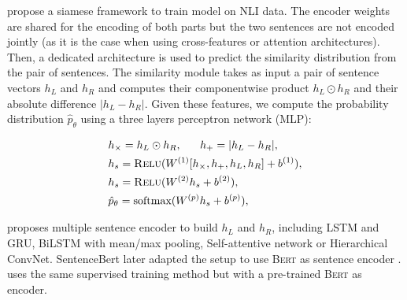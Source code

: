 \textcite{conneau_17} propose a siamese framework to train model on NLI data.  The encoder weights are shared for the encoding of both parts but the two sentences are not encoded jointly (as it is the case when using cross-features or attention architectures). Then, a dedicated architecture is used to predict the similarity distribution from the pair of sentences. The similarity module takes as input a pair of sentence vectors $h_{L} $ and $h_{R}$ and computes their component\-wise product $h_{L} \odot h_{R}$ and their absolute difference $|h_{L} - h_{R}|$. Given these features, we compute the probability distribution  $\hat{p}_{\theta}$ using a three layers perceptron network (MLP):

\begin{align}
\begin{split}
&h_{\times}=h_L\odot h_R, ~~~~~h_{+} = |h_L - h_R |, \\
&h_s = \textsc{Relu}(W^{(1)}[h_{\times}, h_{+}, h_L, h_R] + b^{(1)}), \\
&h_s = \textsc{Relu}(W^{(2)}h_s + b^{(2)}), \\
&\hat{p}_{\theta} = \text{softmax}(W^{(p)}h_s + b^{(p)}),\\
\end{split}
\end{align}


\textcite{conneau_17} proposes multiple sentence encoder to build $h_{L} $ and $h_{R}$, including LSTM and GRU, BiLSTM with mean/max pooling, Self-attentive network or Hierarchical ConvNet. SentenceBert later adapted the setup to use \textsc{Bert} as sentence encoder \parencite{reimers_19}. \textcite{reimers_19} uses the same supervised training method but with a pre-trained \textsc{Bert} as encoder.

